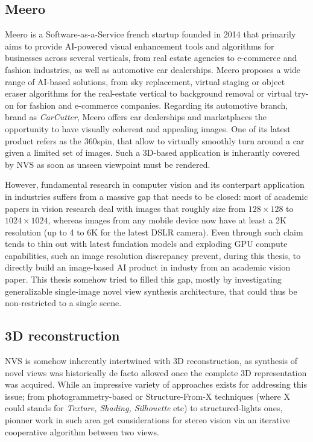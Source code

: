 \subsection{Meero}
Meero is a Software-as-a-Service french startup founded in 2014 that primarily aims to provide \ac{AI}-powered visual enhancement tools and algorithms for businesses across several verticals, from real estate agencies to e-commerce and fashion industries, as well as automotive car dealerships. Meero proposes a wide range of \ac{AI}-based solutions, from sky replacement, virtual staging or object eraser algorithms for the real-estate vertical to background removal or virtual try-on for fashion and e-commerce companies. Regarding its automotive branch, brand as \textit{CarCutter}, Meero offers car dealerships and marketplaces the opportunity to have visually coherent and appealing images. One of its latest product refers as the 360\degree spin, that allow to virtually smoothly turn around a car given a limited set of images. Such a 3D-based application is inherantly covered by \ac{NVS} as soon as unseen viewpoint must be rendered. 

However, fundamental research in computer vision and its conterpart application in industries suffers from a massive gap that needs to be closed: most of academic papers in vision research deal with images that roughly size from $128\times128$ to $1024\times1024$, whereas images from any mobile device now have at least a 2K resolution (up to 4 to 6K for the latest DSLR camera). Even through such claim tends to thin out with latest fundation models and exploding \ac{GPU} compute capabilities, such an image resolution discrepancy prevent, during this thesis, to directly build an image-based \ac{AI} product in industy from an academic vision paper. This thesis somehow tried to filled this gap, mostly by investigating generalizable single-image novel view synthesis architecture, that could thus be non-restricted to a single scene. 

\subsection{3D reconstruction}
 \ac{NVS} is somehow inherently intertwined with 3D reconstruction, as synthesis of novel views was historically de facto allowed once the complete 3D representation was acquired. While an impressive variety of approaches exists for addressing this issue; from photogrammetry-based or Structure-From-X techniques (where X could stands for \textit{Texture, Shading, Silhouette} etc) to structured-lights ones, pionner work in such area get considerations for stereo vision \citep{marr1976cooperative} via an iterative cooperative algorithm between two views. 
 
